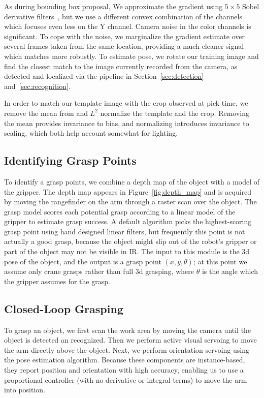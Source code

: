 \documentclass{article}
\begin{document}
As during bounding box proposal, We approximate the gradient using 
$5 \times 5$ Sobel derivative filters~\citep{sobel95}, but we use a
different convex combination of the channels which focuses even less
on the Y channel.  Camera noise in the color channels is significant. To
cope with the noise, we marginalize the gradient estimate over several
frames taken from the same location, providing a much cleaner signal which matches more robustly.  To estimate 
pose, we rotate our training image and find the closest match to the 
image currently recorded from the camera, as detected and localized via 
the pipeline in Section~\ref{sec:detection} and~\ref{sec:recognition}.

In order to match our template image with the crop observed at pick time,
we remove the mean from and $L^2$ normalize the template and the crop.
Removing the mean provides invariance to bias, and normalizing introduces
invariance to scaling, which both help account somewhat
for lighting. 

\subsection{Identifying Grasp Points}

To identify a grasp points, we combine a depth map of the object with
a model of the gripper.  The depth map appears in
Figure~\ref{fig:depth_map} and is acquired by moving the rangefinder on the
arm through a raster scan over the object.  The grasp model scores each potential
grasp according to a linear model of the gripper to estimate grasp
success. A default algorithm picks the highest-scoring grasp point
using hand designed linear filters,
but frequently this point is not actually a good grasp, because the
object might slip out of the robot's gripper or part of the object may
not be visible in IR.  The input to this module is the 3d pose of the
object, and the output is a grasp point $(x, y, \theta)$; at this point we
assume only crane grasps rather than full 3d grasping, where $\theta$
is the angle which the gripper assumes for the grasp.



\subsection{Closed-Loop Grasping}

To grasp an object, we first scan the work area by moving the camera
until the object is detected an recognized.  Then we perform active
visual servoing to move the arm directly above the object.  Next, we
perform orientation servoing using the pose estimation
algorithm. Because these components are instance-based, they report
position and orientation with high accuracy, enabling us to use a
proportional controller (with no derivative or integral terms) to move
the arm into position.
\end{document}
